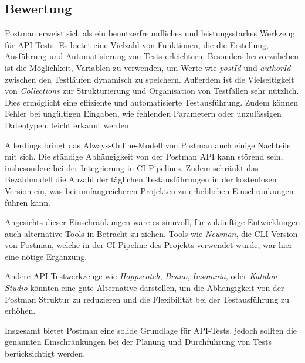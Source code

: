 \subsection{Bewertung}

Postman erweist sich als ein benutzerfreundliches und leistungsstarkes Werkzeug für API-Tests. 
Es bietet eine Vielzahl von Funktionen, die die Erstellung, Ausführung und Automatisierung von Tests erleichtern. 
Besonders hervorzuheben ist die Möglichkeit, Variablen zu verwenden, 
um Werte wie \textit{postId} und \textit{authorId} zwischen den Testläufen dynamisch zu speichern.
Außerdem ist die Vielseitigkeit von \textit{Collections} zur Strukturierung und Organisation von Testfällen sehr nützlich.
Dies ermöglicht eine effiziente und automatisierte Testausführung. 
Zudem können Fehler bei ungültigen Eingaben, wie fehlenden Parametern oder unzulässigen Datentypen, leicht erkannt werden.

Allerdings bringt das Always-Online-Modell von Postman auch einige Nachteile mit sich. 
Die ständige Abhängigkeit von der Postman API kann störend sein, insbesondere bei der Integrierung in \ac{CI}-Pipelines.
Zudem schränkt das Bezahlmodell die Anzahl der täglichen Testausführungen in der kostenlosen Version ein, 
was bei umfangreicheren Projekten zu erheblichen Einschränkungen führen kann.

Angesichts dieser Einschränkungen wäre es sinnvoll, für zukünftige Entwicklungen auch alternative Tools in Betracht zu ziehen. 
Tools wie \textit{Newman}, die CLI-Version von Postman, welche in der \ac{CI} Pipeline des Projekts verwendet wurde,
war hier eine nötige Ergänzung.

Andere API-Testwerkzeuge wie \textit{Hoppscotch}, \textit{Bruno}, \textit{Insomnia}, oder \textit{Katalon Studio} könnten eine gute Alternative darstellen, 
um die Abhängigkeit von der Postman Struktur zu reduzieren und die Flexibilität bei der Testausführung zu erhöhen.

Insgesamt bietet Postman eine solide Grundlage für API-Tests, 
jedoch sollten die genannten Einschränkungen bei der Planung und Durchführung von Tests berücksichtigt werden.
